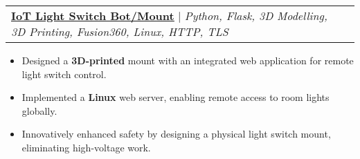 \documentclass[letterpaper]{article}
\makeatletter
\newcommand{\resumeItem}[1]{
  \item\small{
    {#1 \vspace{-2pt}}
  }
}
\newcommand{\resumeProjectHeading}[2]{
    \item
    \begin{tabular*}{0.97\textwidth}{l@{\extracolsep{\fill}}r}
      \small#1 & #2 \\
    \end{tabular*}\vspace{-7pt}
}
\newcommand{\resumeItemListStart}{\begin{itemize}}
\newcommand{\resumeItemListEnd}{\end{itemize}\vspace{-5pt}}
\makeatother
\begin{document}
      \resumeProjectHeading
          {\textbf{\underline{\href{https://www.gavintranquilino.com/light-switch.html}{IoT Light Switch Bot/Mount}}} $|$ \emph{Python, Flask, 3D Modelling, 3D Printing, Fusion360, Linux, HTTP, TLS}}{}
          \resumeItemListStart
            \resumeItem{Designed a \textbf{3D-printed} mount with an integrated web application for remote light switch control.}
            \resumeItem{Implemented a \textbf{Linux} web server, enabling remote access to room lights globally.}
            \resumeItem{Innovatively enhanced safety by designing a physical light switch mount, eliminating high-voltage work.}
          \resumeItemListEnd




\end{document}
